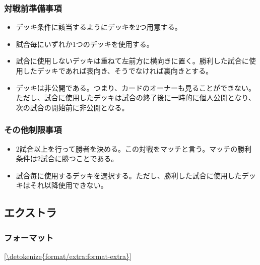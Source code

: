 \documentclass[letterpaper,10pt,dvipdfmx]{sphinxmanual}
\begin{document}
\subsubsection{対戦前準備事項}
\label{\detokenize{match-regulations/master_randomhalf:id4}}\begin{itemize}
\item {} 
\sphinxAtStartPar
デッキ条件に該当するようにデッキを2つ用意する。

\item {} 
\sphinxAtStartPar
試合毎にいずれか1つのデッキを使用する。

\item {} 
\sphinxAtStartPar
試合に使用しないデッキは重ねて左前方に横向きに置く。勝利した試合に使用したデッキであれば表向き、そうでなければ裏向きとする。

\item {} 
\sphinxAtStartPar
デッキは非公開である。つまり、カードのオーナーも見ることができない。ただし、試合に使用したデッキは試合の終了後に一時的に個人公開となり、次の試合の開始前に非公開となる。

\end{itemize}


\subsubsection{その他制限事項}
\label{\detokenize{match-regulations/master_randomhalf:id5}}\begin{itemize}
\item {} 
\sphinxAtStartPar
2試合以上を行って勝者を決める。この対戦をマッチと言う。マッチの勝利条件は2試合に勝つことである。

\item {} 
\sphinxAtStartPar
試合毎に使用するデッキを選択する。ただし、勝利した試合に使用したデッキはそれ以降使用できない。

\end{itemize}

\sphinxstepscope


\subsection{エクストラ}
\label{\detokenize{match-regulations/extra:id1}}\label{\detokenize{match-regulations/extra::doc}}

\subsubsection{フォーマット}
\label{\detokenize{match-regulations/extra:id2}}
\sphinxAtStartPar
\hyperref[\detokenize{format/extra:format-extra}]{\ref{\detokenize{format/extra:format-extra}} }
\end{document}
